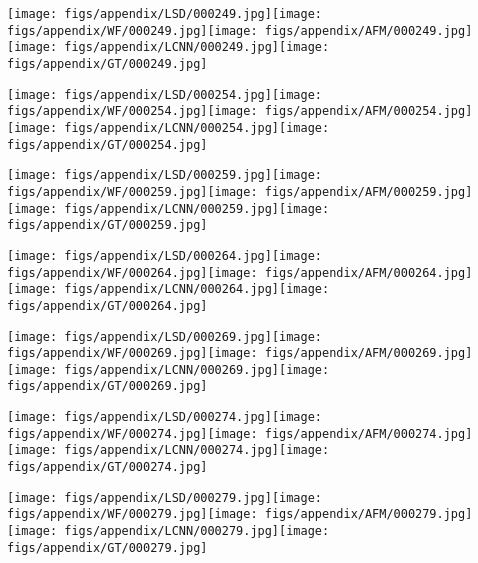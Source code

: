 \documentclass[10pt,twocolumn,letterpaper]{article}
\begin{document}
\texttt{[image: figs/appendix/LSD/000249.jpg]}\texttt{[image: figs/appendix/WF/000249.jpg]}\texttt{[image: figs/appendix/AFM/000249.jpg]}\texttt{[image: figs/appendix/LCNN/000249.jpg]}\texttt{[image: figs/appendix/GT/000249.jpg]}

\texttt{[image: figs/appendix/LSD/000254.jpg]}\texttt{[image: figs/appendix/WF/000254.jpg]}\texttt{[image: figs/appendix/AFM/000254.jpg]}\texttt{[image: figs/appendix/LCNN/000254.jpg]}\texttt{[image: figs/appendix/GT/000254.jpg]}

\texttt{[image: figs/appendix/LSD/000259.jpg]}\texttt{[image: figs/appendix/WF/000259.jpg]}\texttt{[image: figs/appendix/AFM/000259.jpg]}\texttt{[image: figs/appendix/LCNN/000259.jpg]}\texttt{[image: figs/appendix/GT/000259.jpg]}

\texttt{[image: figs/appendix/LSD/000264.jpg]}\texttt{[image: figs/appendix/WF/000264.jpg]}\texttt{[image: figs/appendix/AFM/000264.jpg]}\texttt{[image: figs/appendix/LCNN/000264.jpg]}\texttt{[image: figs/appendix/GT/000264.jpg]}

\texttt{[image: figs/appendix/LSD/000269.jpg]}\texttt{[image: figs/appendix/WF/000269.jpg]}\texttt{[image: figs/appendix/AFM/000269.jpg]}\texttt{[image: figs/appendix/LCNN/000269.jpg]}\texttt{[image: figs/appendix/GT/000269.jpg]}

\texttt{[image: figs/appendix/LSD/000274.jpg]}\texttt{[image: figs/appendix/WF/000274.jpg]}\texttt{[image: figs/appendix/AFM/000274.jpg]}\texttt{[image: figs/appendix/LCNN/000274.jpg]}\texttt{[image: figs/appendix/GT/000274.jpg]}

\texttt{[image: figs/appendix/LSD/000279.jpg]}\texttt{[image: figs/appendix/WF/000279.jpg]}\texttt{[image: figs/appendix/AFM/000279.jpg]}\texttt{[image: figs/appendix/LCNN/000279.jpg]}\texttt{[image: figs/appendix/GT/000279.jpg]}
\end{document}
